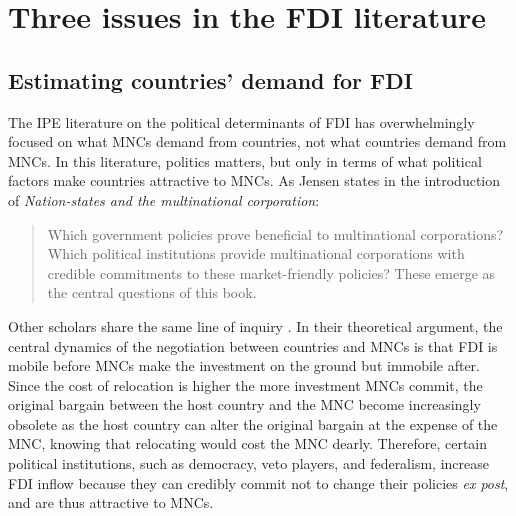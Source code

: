 \chapter{Three issues in the FDI literature}
\label{chap:literature_issues}

\section{Estimating countries' demand for FDI}

The IPE literature on the political determinants of FDI has overwhelmingly
focused on what MNCs demand from countries, not what countries demand from MNCs.
In this literature, politics matters, but only in terms of what political
factors make countries attractive to MNCs. As Jensen states in the introduction
of \textit{Nation-states and the multinational corporation}:

\begin{quote}
  Which government policies prove beneficial to multinational corporations?
  Which political institutions provide multinational corporations with credible
  commitments to these market-friendly policies? These emerge as the central
  questions of this book.
\end{quote}

Other scholars share the same line of inquiry \citep{Ahlquist2006, Busse2007,
  Buthe2008, Li2003}. In their theoretical argument, the central dynamics of the
negotiation between countries and MNCs is that FDI is mobile before MNCs make
the investment on the ground but immobile after. Since the cost of relocation is
higher the more investment MNCs commit, the original bargain between the host
country and the MNC become increasingly obsolete as the host country can alter
the original bargain at the expense of the MNC, knowing that relocating would
cost the MNC dearly. Therefore, certain political institutions, such as
democracy, veto players, and federalism, increase FDI inflow because they can
credibly commit not to change their policies \textit{ex post}, and are thus
attractive to MNCs.

